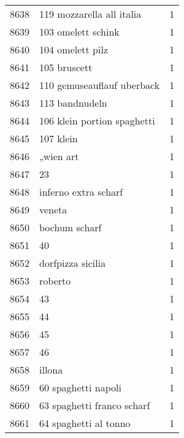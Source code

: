\begin{tabular}{llr}
8638 &                          119 mozzarella all italia &      1 \\
8639 &                                 103 omelett schink &      1 \\
8640 &                                   104 omelett pilz &      1 \\
8641 &                                       105 bruscett &      1 \\
8642 &                         110 gemuseauflauf uberback &      1 \\
8643 &                                     113 bandnudeln &      1 \\
8644 &                        106 klein portion spaghetti &      1 \\
8645 &                                          107 klein &      1 \\
8646 &                                          „wien art &      1 \\
8647 &                                                 23 &      1 \\
8648 &                               inferno extra scharf &      1 \\
8649 &                                             veneta &      1 \\
8650 &                                      bochum scharf &      1 \\
8651 &                                                 40 &      1 \\
8652 &                                  dorfpizza sicilia &      1 \\
8653 &                                            roberto &      1 \\
8654 &                                                 43 &      1 \\
8655 &                                                 44 &      1 \\
8656 &                                                 45 &      1 \\
8657 &                                                 46 &      1 \\
8658 &                                             illona &      1 \\
8659 &                                60 spaghetti napoli &      1 \\
8660 &                         63 spaghetti franco scharf &      1 \\
8661 &                              64 spaghetti al tonno &      1 \\

\end{tabular}
